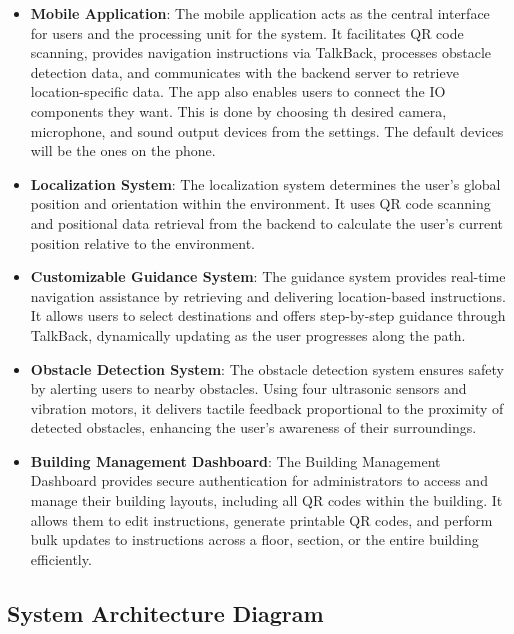 \begin{itemize}
	\item \textbf{Mobile Application}: The mobile application acts as the central interface for users and the processing unit for the system. It facilitates QR code scanning, provides navigation instructions via TalkBack, processes obstacle detection data, and communicates with the backend server to retrieve location-specific data. The app also enables users to connect the IO components they want. This is done by choosing th desired camera, microphone, and sound output devices from the settings. The default devices will be the ones on the phone.
	
	\item \textbf{Localization System}: The localization system determines the user’s global position and orientation within the environment. It uses QR code scanning and positional data retrieval from the backend to calculate the user’s current position relative to the environment.
	
	\item \textbf{Customizable Guidance System}: The guidance system provides real-time navigation assistance by retrieving and delivering location-based instructions. It allows users to select destinations and offers step-by-step guidance through TalkBack, dynamically updating as the user progresses along the path.
	
	\item \textbf{Obstacle Detection System}: The obstacle detection system ensures safety by alerting users to nearby obstacles. Using four ultrasonic sensors and vibration motors, it delivers tactile feedback proportional to the proximity of detected obstacles, enhancing the user's awareness of their surroundings.


	\item \textbf{Building Management Dashboard}: The Building Management Dashboard provides secure authentication for administrators to access and manage their building layouts, including all QR codes within the building. It allows them to edit instructions, generate printable QR codes, and perform bulk updates to instructions across a floor, section, or the entire building efficiently.
	
\end{itemize}



\subsection{System Architecture Diagram}

